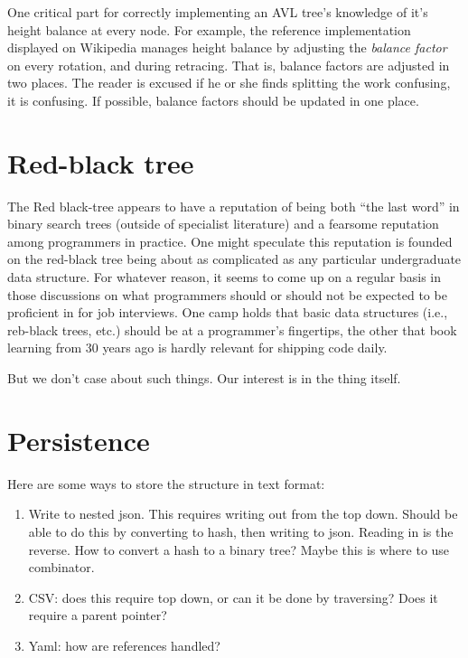 \documentclass{article}
\begin{document}
One critical part for correctly implementing an AVL tree's knowledge of
it's height balance at every node. For example, the reference implementation
displayed on Wikipedia manages height balance by adjusting the
\textit{balance factor} on every rotation, and during retracing. That is,
balance factors are adjusted in two places. The reader is excused if
he or she finds splitting the work confusing, it is confusing. If possible,
balance factors should be updated in one place.

\section{Red-black tree}

The Red black-tree appears to have a reputation of being both ``the last word''
in binary search trees (outside of specialist literature) and a fearsome
reputation among programmers in practice. One might speculate this reputation
is founded on the red-black tree being about as complicated as any particular
undergraduate data structure. For whatever reason, it seems to come up on a
regular basis in those discussions on what programmers should or should not be
expected to be proficient in for job interviews. One camp holds that basic data
structures (i.e., reb-black trees, etc.) should be at a programmer's
fingertips, the other that book learning from 30 years ago is hardly relevant
for shipping code daily.

But we don't case about such things. Our interest is in the thing itself.


\section{Persistence}

Here are some ways to store the structure in text format:

\begin{enumerate}
\item Write to nested json. This requires writing out from the top
down. Should be able to do this by converting to hash, then
writing to json. Reading in is the reverse. How to convert a
hash to a binary tree? Maybe this is where to use combinator.

\item CSV: does this require top down, or can it be done by traversing?
Does it require a parent pointer?

\item Yaml: how are references handled?
\end{enumerate}
\end{document}

